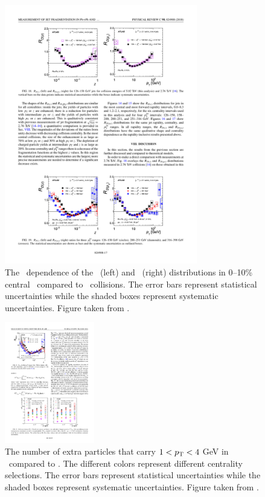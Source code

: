 \begin{figure}[htbp]
\begin{center}
\includegraphics[width=0.75\textwidth]{figures/jetMeasurements/jetff_jetpt_dep}
\caption{The \ptjet\ dependence of the \Rdz\ (left) and \Rdpt\ (right) distributions in 0--10\% central \pbpb\ compared to \pp\ collisions.
The error bars represent statistical uncertainties while the shaded boxes represent systematic uncertainties.
Figure taken from \cite{PhysRevC.98.024908}.}
\label{fig:jetff_jetpt_dep}
\end{center}
\end{figure}


\begin{figure}[htbp]
\begin{center}
\includegraphics[width=0.35\textwidth]{figures/jetMeasurements/jetff_nch}
\caption{The number of extra particles that carry $1<\mbox{$p_{\mathrm{T}}$}<4$ GeV  in \pbpb\ compared to \pp.
The different colors represent different centrality selections.
The error bars represent statistical uncertainties while the shaded boxes represent systematic uncertainties.
Figure taken from \cite{PhysRevC.98.024908}.}
\label{fig:jetff_nch}
\end{center}
\end{figure}

